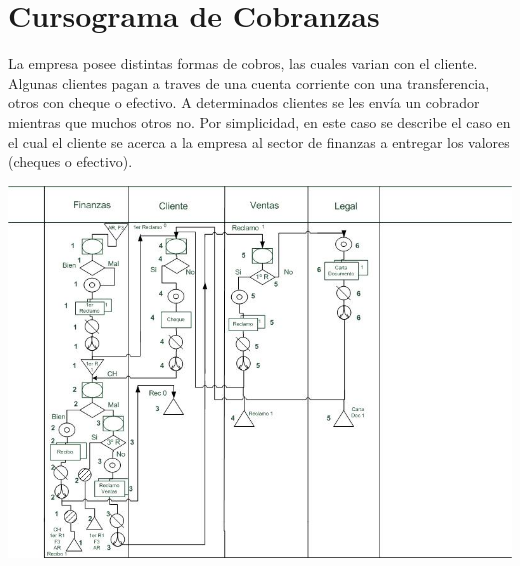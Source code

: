 \pagebreak
\section{Cursograma de Cobranzas}
La empresa posee distintas formas de cobros, las cuales varian con el cliente. Algunas clientes pagan a traves de una cuenta corriente con una transferencia, otros con cheque o efectivo. A determinados clientes se les envía un cobrador mientras que muchos otros no.
Por simplicidad, en este caso se describe el caso en el cual el cliente se acerca a la empresa al sector de finanzas a entregar los valores (cheques o efectivo).

\includegraphics[scale=0.8]{Empresa/Circuitos/Cobranzas/cursograma-para-manual-cobranzas-3.jpg}

\pagebreak
